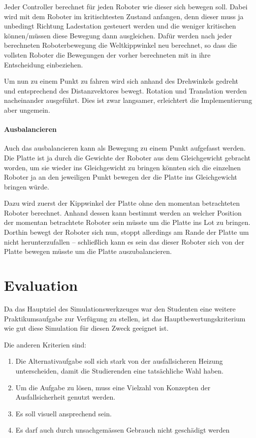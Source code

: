 {Jeder Controller berechnet f{\"{u}}r jeden Roboter wie dieser sich bewegen soll. Dabei wird mit dem Roboter
im kritischtesten Zustand anfangen, denn dieser muss ja unbedingt Richtung Ladestation gesteuert werden 
und die weniger kritischen k{\"{o}}nnen/m{\"{u}}ssen diese Bewegung dann ausgleichen. Daf{\"{u}}r werden nach
jeder berechneten Roboterbewegung die Weltkippwinkel neu berechnet, so dass die vollsten Roboter die Bewegungen
der vorher berechneten mit in ihre Entscheidung einbeziehen.


Um nun zu einem Punkt zu fahren wird sich anhand des Drehwinkels gedreht und entsprechend des Distanzvektores 
bewegt. Rotation und Translation werden nacheinander ausgef{\"{u}}hrt. Dies ist zwar langsamer, erleichtert die
Implementierung aber ungemein.

\paragraph{Ausbalancieren} Auch das ausbalancieren kann als Bewegung zu einem Punkt aufgefasst werden.
Die Platte ist ja durch die Gewichte der Roboter aus dem Gleichgewicht gebracht worden, um sie wieder ins
Gleichgewicht zu bringen k{\"{o}}nnten sich die einzelnen Roboter ja an den jeweiligen Punkt bewegen der
die Platte ins Gleichgewicht bringen w{\"{u}}rde.

Dazu wird zuerst der Kippwinkel der Platte ohne den momentan betrachteten Roboter berechnet. Anhand dessen
kann bestimmt werden an welcher Position der momentan betrachtete Roboter sein m{\"{u}}sste um die Platte
ins Lot zu bringen. Dorthin bewegt der Roboter sich nun, stoppt allerdings am Rande der Platte um nicht
herunterzufallen -- schlie{\ss}lich kann es sein das dieser Roboter sich von der Platte bewegen m{\"{u}}sste
um die Platte auszubalancieren.

\clearpage
\section{Evaluation}
Da das Hauptziel des Simulationswerkzeuges war den Studenten eine weitere Praktikumsaufgabe zur Verf{\"{u}}gung
zu stellen, ist das Hauptbewertungskriterium wie gut diese Simulation f{\"{u}}r diesen Zweck geeignet ist.

Die anderen Kriterien sind: \todo{}

\begin{enumerate}
	\item Die Alternativaufgabe soll sich stark von der ausfallsicheren Heizung unterscheiden, damit die Studierenden eine tats{\"{a}}chliche Wahl haben.
	\item Um die Aufgabe zu l{\"{o}}sen, muss eine Vielzahl von Konzepten der Ausfallsicherheit genutzt werden.
	\item Es soll visuell ansprechend sein.
	\item Es darf auch durch unsachgem{\"{a}}ssen Gebrauch nicht gesch{\"{a}}digt werden
\end{enumerate}

}
